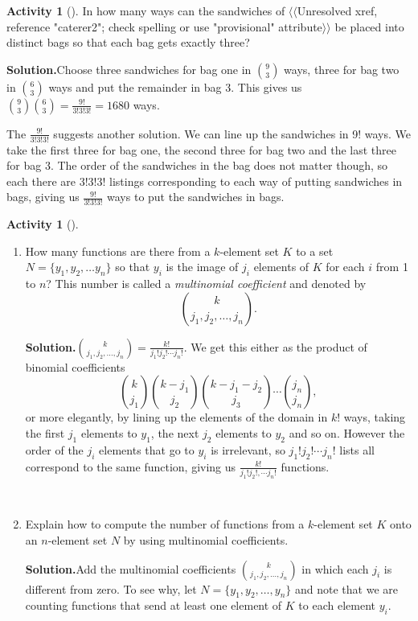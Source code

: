 \documentclass[10pt,]{book}
\theoremstyle{plain}
\theoremstyle{definition}
\newtheorem{activity}[project]{Activity}
\numberwithin{equation}{chapter}
\begin{document}
\begin{activity}[]\label{activity-128}
In how many ways can the sandwiches of {$\langle\langle$Unresolved xref, reference "caterer2"; check spelling or use "provisional" attribute$\rangle\rangle$} be placed into distinct bags so that each bag gets exactly three?%
\par\medskip\noindent%
\textbf{Solution.}\quad Choose three sandwiches for bag one in \(\binom{9}{3}\) ways, three for bag two in \(\binom{6}{3}\) ways and put the remainder in bag 3.  This gives us \(\binom{9}{3}\binom{6}{3}=\frac{9!}{3!3!3!}=1680\) ways.%
\par
The \(\frac{9!}{3!3!3!}\) suggests another solution. We can line up the sandwiches in 9! ways. We take the first three for bag one, the second three for bag two and the last three for bag 3. The order of the sandwiches in the bag does not matter though, so each there are \(3!3!3!\) listings corresponding to each way of putting sandwiches in bags, giving us \(\frac{9!}{3!3!3!}\) ways to put the sandwiches in bags.%
\end{activity}
\begin{activity}[]\label{activity-129}
~\par
\begin{enumerate}[label=(\alph*)]
 \item How many functions are there from a \(k\)-element set \(K\) to a set \(N=\{y_1,y_2,\ldots y_n\}\) so that \(y_i\) is the image of \(j_i\) elements of \(K\) for each \(i\) from 1 to \(n\)? This number is called a \emph{multinomial coefficient} and denoted by%
\begin{equation*}
\binom{k}{j_1,j_2,\ldots, j_n}.
\end{equation*}
%
\par\medskip\noindent%
\textbf{Solution.}\quad \(\binom{k}{j_1,j_2,\ldots, j_n} =
\frac{k!}{j_1!j_2!\cdots j_n!}\). We get this either as the product of binomial coefficients%
\begin{equation*}
\binom{k}{j_1}\binom{k-j_1}{j_2}\binom{k-j_1-j_2}{j_3}\cdots\binom{j_n}{j_n},
\end{equation*}
or more elegantly, by lining up the elements of the domain in \(k!\) ways, taking the first \(j_1\) elements to \(y_1\), the next \(j_2\) elements to \(y_2\) and so on.  However the order of the \(j_i\) elements that go to \(y_i\) is irrelevant, so \(j_1!j_2!\cdots j_n!\) lists all correspond to the same function, giving us \(\frac{k!}{j_1!j_2!,\cdots j_n!}\) functions.%

~\par
\item Explain how to compute the number of functions from a \(k\)-element set \(K\) onto an \(n\)-element set \(N\) by using multinomial coefficients.%
\par\medskip\noindent%
\textbf{Solution.}\quad Add the multinomial coefficients \(\binom{k}{j_1,j_2,\ldots,j_n}\) in which each \(j_i\) is different from zero. To see why, let \(N=\{y_1,y_2,\ldots,y_n\}\) and note that we are counting functions that send at least one element of \(K\) to each element \(y_i\).%

\end{enumerate}
\end{activity}
\end{document}
